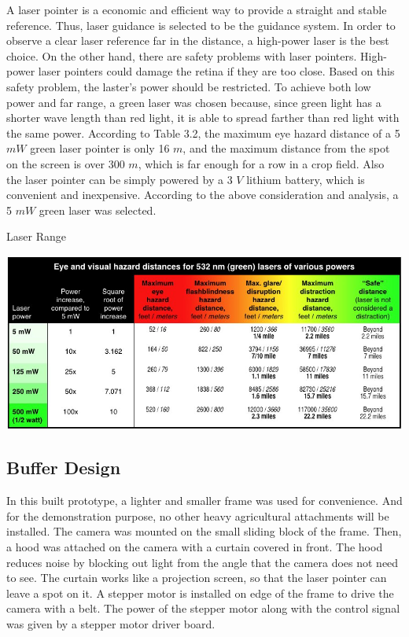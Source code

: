 \documentclass[letterpaper,12pt,oneside]{book}
\begin{document}
		A laser pointer is a economic and efficient way to provide a straight and stable reference. Thus, laser guidance is selected to be the guidance system. In order to observe a clear laser reference far in the distance, a high-power laser is the best choice. On the other hand, there are safety problems with laser pointers. High-power laser pointers could damage the retina if they are too close. Based on this safety problem, the laster's power should be restricted. To achieve both low power and far range, a green laser was chosen because, since green light has a shorter wave length than red light, it is able to spread farther than red light with the same power. According to Table 3.2, the maximum eye hazard distance of a 5 $mW$ green laser pointer is only 16 $m$, and the maximum distance from the spot on the screen is over 300 $m$, which is far enough for a row in a crop field. Also the laser pointer can be simply powered by a 3 $V$ lithium battery, which is convenient and inexpensive. According to the above consideration and analysis, a 5 $mW$ green laser was selected.
		\begin{table}[ht!]
			\begin{center}
				\caption{Laser Range}
				\includegraphics[scale = 0.5]{laserrange.jpg}
			\end{center}
		\end{table}
		
		\subsection{Buffer Design}
		
		
		In this built prototype, a lighter and smaller frame was used for convenience. And for the demonstration purpose, no other heavy agricultural attachments will be installed. The camera was mounted on the small sliding block of the frame. Then, a hood was attached on the camera with a curtain covered in front. The hood reduces noise by blocking out light from the angle that the camera does not need to see. The curtain works like a projection screen, so that the laser pointer can leave a spot on it.  A stepper motor is installed on edge of the frame to drive the camera with a belt. The power of the stepper motor along with the control signal was given by a stepper motor driver board. 
		
\end{document}

